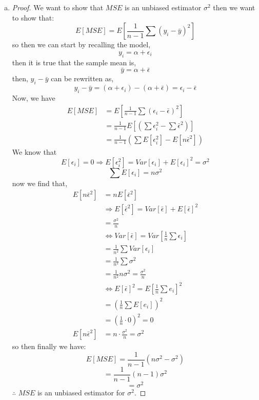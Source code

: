 \documentclass[12pt]{article}
\begin{document}
\begin{enumerate}[1.]
\begin{enumerate}[(a)]
            \item 
            \begin{proof} We want to show that $MSE$ is an unbiased estimator $\sigma^2$ then we want to show that:
                \[E[MSE] = E\left[\frac{1}{n-1} \sum (y_i - \bar{y})^2 \right]\]
                so then we can start by recalling the model,
                \[ y_i = \alpha + \epsilon_i \]
                then it is true that the sample mean is,
                \[ \bar{y} = \alpha + \bar{\epsilon}\]
                then, $y_i - \bar{y}$ can be rewritten as,
                \[ y_i - \bar{y} = (\alpha + \epsilon_i) - (\alpha + \bar{\epsilon}) = \epsilon_i - \bar{\epsilon}\]
                Now, we have
                \begin{align*}
                    E[MSE] &= E\left[\frac{1}{n-1} \sum (\epsilon_i - \bar{\epsilon})^2 \right] \\ 
                    &= \frac{1}{n-1} E\left[(\sum \epsilon_i^2 - \sum \bar{\epsilon}^2) \right] \\ 
                    &= \frac{1}{n-1} (\sum E[\epsilon_i^2] - E[n\bar{\epsilon}^2] )
                \end{align*}
                We know that 
                \[E[\epsilon_i] = 0 \Rightarrow E[\epsilon_i^2] = Var[\epsilon_i] + E[\epsilon_i]^2 = \sigma^2\]
                \[\sum E[\epsilon_i] = n\sigma^2\]
                now we find that,
                \begin{align*}
                    E[n\bar{\epsilon}^2] &= nE[\bar{\epsilon}^2] \\
                    &\Rightarrow E[\bar{\epsilon}^2] = Var[\bar{\epsilon}] + E[\bar{\epsilon}]^2 \\
                    &= \frac{\sigma^2}{n}\\
                    &\Leftrightarrow Var[\bar{\epsilon}] = Var[\frac{1}{n} \sum \epsilon_i] \\
                    &= \frac{1}{n^2} \sum Var[\epsilon_i] \\
                    &= \frac{1}{n^2} \sum \sigma^2 \\
                    &= \frac{1}{n^2} n \sigma^2 = \frac{\sigma^2}{n}  \\
                    &\Leftrightarrow E[\bar{\epsilon}]^2 = E[\frac{1}{n} \sum e_i]^2 \\ 
                    &= (\frac{1}{n} \sum E[e_i])^2 \\ 
                    &= (\frac{1}{n} \cdot 0)^2  = 0 \\ 
                    E[n\bar{\epsilon}^2] &= n \cdot \frac{\sigma^2}{n} = \sigma^2
                \end{align*}
                so then finally we have:
                \[E[MSE] = \frac{1}{n-1}(n\sigma^2 - \sigma^2) \]
                \[= \frac{1}{n-1} (n-1) \sigma^2 \]
                \[=  \sigma^2\]
                $\therefore$ $MSE$ is an unbiased estimator for $\sigma^2$.
            \end{proof}
        \end{enumerate}
\end{enumerate}
\end{document}
